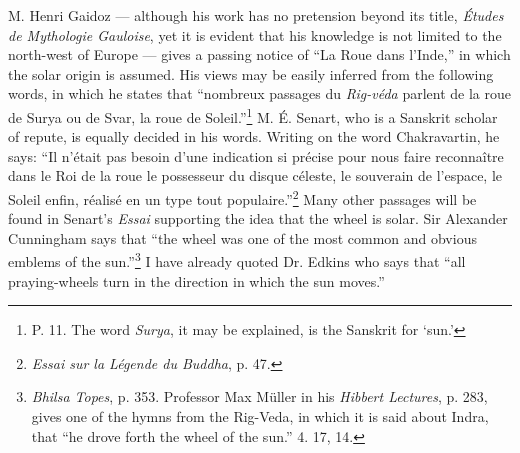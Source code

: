 \documentclass[a4paper, 11pt, oneside, polutonikogreek, english]{article}
\begin{document}
M. Henri Gaidoz --- although his work has no pretension beyond its title, \emph{Études de Mythologie Gauloise}, yet it is evident that his knowledge is not limited to the north-west of Europe --- gives a passing notice of ``La Roue dans l'Inde,'' in which the solar origin is assumed. His views may be easily inferred from the following words, in which he states that ``nombreux passages du \emph{Rig-véda} parlent de la roue de Surya ou de Svar, la roue de Soleil.''\footnote{P. 11. The word \emph{Surya}, it may be explained, is the Sanskrit for `sun.'} M. É. Senart, who is a Sanskrit scholar of repute, is equally decided in his words. Writing on the word Chakravartin, he says: ``Il n'était pas besoin d'une indication si précise pour nous faire reconnaître dans le Roi de la roue le possesseur du disque céleste, le souverain de l'espace, le Soleil enfin, réalisé en un type tout populaire.''\footnote{\emph{Essai sur la Légende du Buddha}, p. 47.} Many other passages will be found in Senart's \emph{Essai} supporting the idea that the wheel is solar. Sir Alexander Cunningham says that ``the wheel was one of the most common and obvious emblems of the sun.''\footnote{\emph{Bhilsa Topes}, p. 353. Professor Max Müller in his \emph{Hibbert Lectures}, p. 283, gives one of the hymns from the Rig-Veda, in which it is said about Indra, that ``he drove forth the wheel of the sun.'' 4. 17, 14.} I have already quoted Dr. Edkins who says that ``all praying-wheels turn in the direction in which the sun moves.''
\end{document}

